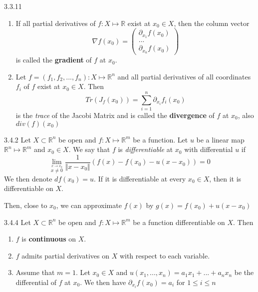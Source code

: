 \documentclass[8pt,a4paper,twocolumn,table]{extarticle}
\newcommand{\R}{\mathbb{R}}
\begin{document}
\begin{definition}{3.3.11}
    \begin{enumerate}
        \item If all partial derivatives of $f: X \mapsto \R$ exist at $x_0 \in X$, then the column vector
              \[ \nabla f(x_0) = \begin{pmatrix}
                      \partial_{x_1} f(x_0) \\
                      ...                   \\
                      \partial_{x_n} f(x_0)
                  \end{pmatrix} \]
              is called the \textbf{gradient} of $f$ at $x_0$.
        \item Let $f = (f_1, f_2, ..., f_n): X \mapsto \R^n$ and all partial derivatives of all coordinates $f_i$ of $f$ exist at $x_0 \in X$. Then
              \[ Tr(J_f(x_0)) = \sum_{i=1}^{n} \partial_{x_i} f_i(x_0) \]
              is the \textit{trace} of the Jacobi Matrix and is called the \textbf{divergence} of $f$ at $x_0$, also $div(f)(x_0)$
    \end{enumerate}

\end{definition}

\begin{definition}{3.4.2}
    Let $X \subset \R^n$ be open and $f: X \mapsto \R^m$ be a function.
    Let $u$ be a linear map $\R^n \mapsto \R^m$ and $x_0 \in X$. We say that $f$ is \textit{differentiable} at
    $x_0$ with differential $u$ if
    \[ \lim_{\stackrel{x \to x_0}{x \ne 0}} \frac{1}{\Vert x - x_0 \Vert}(f(x) - f(x_0) - u(x - x_0)) = 0 \]
    We then denote $df(x_0) = u$. If it is differentiable at every $x_0 \in X$, then it is differentiable on $X$.

    Then, close to $x_0$, we can approximate $f(x)$ by $g(x) = f(x_0) + u(x - x_0)$
\end{definition}

\begin{proposition}{3.4.4}
    Let $X \subset \R^n$ be open and $f: X \mapsto \R^m$ be a function differentiable on $X$. Then
    \begin{enumerate}
        \item $f$ is \textbf{continuous} on $X$.
        \item $f$ admits partial derivatives on $X$ with respect to each variable.
        \item Assume that $m = 1$. Let $x_0 \in X$ and $u(x_1, ..., x_n) = a_1 x_1 + ... + a_n x_n$ be the differential of $f$ at $x_0$.
              We then have $\partial_{x_i} f(x_0) = a_i$ for $1 \le i \le n$
    \end{enumerate}
\end{proposition}
\end{document}

